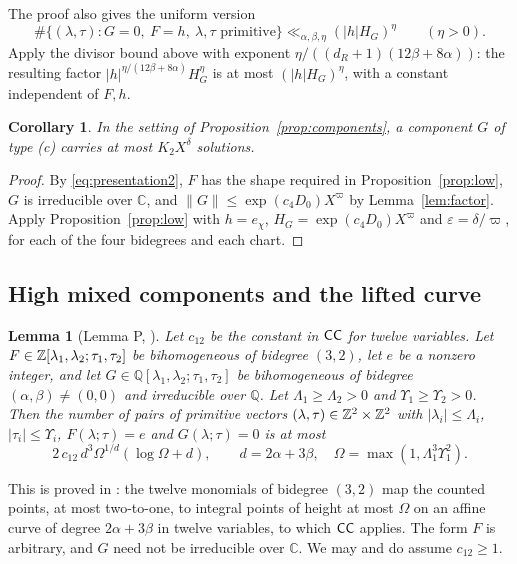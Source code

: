 \documentclass[11pt,reqno]{amsart}
\newtheorem{lemma}[theorem]{Lemma}
\newtheorem{corollary}[theorem]{Corollary}
\theoremstyle{definition}
\theoremstyle{remark}
\numberwithin{equation}{section}
\newcommand{\Q}{\mathbb Q}\newcommand{\C}{\mathbb C}
\newcommand{\eps}{\varepsilon}\newcommand{\card}{\#}
\begin{document}
The proof also gives the uniform version
\begin{equation}\label{eq:lowuniformrhs}
 \#\{(\lambda,\tau):G=0,\ F=h,\ \lambda,\tau\text{ primitive}\}
 \ll_{\alpha,\beta,\eta} (|h|H_G)^\eta
 \qquad(\eta>0).
\end{equation}
Apply the divisor bound above with exponent
$\eta/((d_R+1)(12\beta+8\alpha))$: the resulting factor
$|h|^{\eta/(12\beta+8\alpha)}H_G^\eta$ is at most $(|h|H_G)^\eta$,
with a constant independent of $F,h$.


\begin{corollary}\label{cor:low}
In the setting of Proposition~\ref{prop:components}, a
component $G$ of type \textup{(c)} carries at most $K_2X^{\delta}$ solutions.
\end{corollary}
\begin{proof}
By \eqref{eq:presentation2}, $F$ has the shape required in
Proposition~\ref{prop:low}, $G$ is irreducible over $\C$, and
$\|G\|\le\exp(c_4D_0)X^{\varpi}$ by Lemma~\ref{lem:factor}. Apply
Proposition~\ref{prop:low} with $h=e_\chi$, $H_G=\exp(c_4D_0)X^\varpi$ and
$\eps=\delta/\varpi$, for each of the four bidegrees and each chart.
\end{proof}

\subsection{High mixed components and the lifted curve}
\begin{lemma}[Lemma P, {\cite[Lemma~5.5]{powerful}}]\label{lem:P}
Let $c_{12}$ be the constant in $\mathsf{CC}$ for twelve variables. Let
$F\in\mathbb Z[\lambda_1,\lambda_2;\tau_1,\tau_2]$ be bihomogeneous of bidegree
$(3,2)$, let $e$ be a nonzero integer, and let
$G\in\Q[\lambda_1,\lambda_2;\tau_1,\tau_2]$ be bihomogeneous of bidegree
$(\alpha,\beta)\ne(0,0)$ and irreducible over $\Q$. Let
$\Lambda_1\ge\Lambda_2>0$ and $\Upsilon_1\ge\Upsilon_2>0$. Then the number of
pairs of primitive vectors $(\lambda,\tau)\in\mathbb Z^2\times\mathbb Z^2$ with
$|\lambda_i|\le\Lambda_i$, $|\tau_i|\le\Upsilon_i$, $F(\lambda;\tau)=e$ and
$G(\lambda;\tau)=0$ is at most
\[
 2\,c_{12}\,d^3\Omega^{1/d}(\log\Omega+d),\qquad d=2\alpha+3\beta,\quad
 \Omega=\max(1,\Lambda_1^3\Upsilon_1^2).
\]
\end{lemma}
This is proved in \cite{powerful}: the twelve monomials of bidegree $(3,2)$
map the counted points, at most two-to-one, to integral points of height at
most $\Omega$ on an affine curve of degree $2\alpha+3\beta$ in twelve
variables, to which $\mathsf{CC}$ applies. The form $F$ is arbitrary, and $G$ need
not be irreducible over $\C$. We may and do assume $c_{12}\ge1$.
\end{document}
